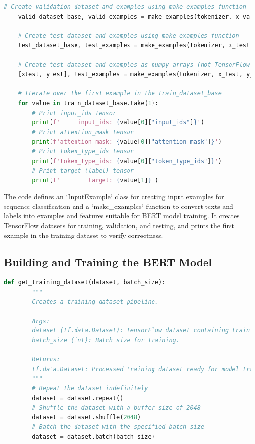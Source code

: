 \documentclass{solutionclass} %
\begin{document}
\begin{solution}
\begin{lstlisting}[language=Python, basicstyle=\ttfamily\footnotesize, keywordstyle=\color{blue}, commentstyle=\color{gray}]
    # Create validation dataset and examples using make_examples function
    valid_dataset_base, valid_examples = make_examples(tokenizer, x_valid, y_valid, maxlen=128)
    
    # Create test dataset and examples using make_examples function
    test_dataset_base, test_examples = make_examples(tokenizer, x_test, y_test, maxlen=128)
    
    # Create test dataset and examples as numpy arrays (not TensorFlow dataset)
    [xtest, ytest], test_examples = make_examples(tokenizer, x_test, y_test, maxlen=128, is_tf_dataset=False)
    
    # Iterate over the first example in the train_dataset_base
    for value in train_dataset_base.take(1):
        # Print input_ids tensor
        print(f'     input_ids: {value[0]["input_ids"]}')
        # Print attention_mask tensor
        print(f'attention_mask: {value[0]["attention_mask"]}')
        # Print token_type_ids tensor
        print(f'token_type_ids: {value[0]["token_type_ids"]}')
        # Print target (label) tensor
        print(f'        target: {value[1]}')
    \end{lstlisting}
    
    The code defines an `InputExample` class for creating input examples for sequence classification and a `make\_examples` function to convert texts and labels into examples and features suitable for BERT model training. It creates TensorFlow datasets for training, validation, and testing, and prints the first example in the training dataset to verify correctness.
    
    \subsection*{Building and Training the BERT Model}
    
    \begin{lstlisting}[language=Python, basicstyle=\ttfamily\footnotesize, keywordstyle=\color{blue}, commentstyle=\color{gray}]
    def get_training_dataset(dataset, batch_size):
        """
        Creates a training dataset pipeline.
    
        Args:
        dataset (tf.data.Dataset): TensorFlow dataset containing training examples.
        batch_size (int): Batch size for training.
    
        Returns:
        tf.data.Dataset: Processed training dataset ready for model training.
        """
        # Repeat the dataset indefinitely
        dataset = dataset.repeat()
        # Shuffle the dataset with a buffer size of 2048
        dataset = dataset.shuffle(2048)
        # Batch the dataset with the specified batch size
        dataset = dataset.batch(batch_size)
    

\end{lstlisting}
\end{solution}
\end{document}
